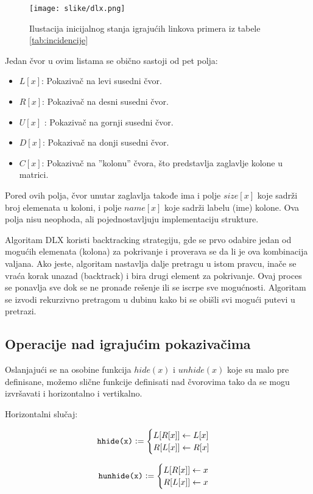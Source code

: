 \documentclass[a4paper]{article}
\begin{document}
{\begin{figure}[h!]
  \begin{center}
  \texttt{[image: slike/dlx.png]}
  \end{center}
  \caption{Ilustacija inicijalnog stanja igrajućih linkova primera iz tabele \ref{tab:incidencije}}
  \label{fig:dlx}
\end{figure}

Jedan čvor u ovim listama se obično sastoji od pet polja:
\begin{itemize}
  \item \( L[x] \): Pokazivač na levi susedni čvor.
  \item \( R[x] \): Pokazivač na desni susedni čvor.
  \item \( U[x] \) : Pokazivač na gornji susedni čvor.
  \item \( D[x] \): Pokazivač na donji susedni čvor.
  \item \( C[x] \): Pokazivač na ''kolonu'' čvora, što predstavlja zaglavlje kolone u matrici.
\end{itemize}

Pored ovih polja, čvor unutar zaglavlja takođe ima i polje \( size[x] \) koje sadrži broj elemenata u
koloni, i polje \( name[x] \) koje sadrži labelu (ime) kolone. Ova polja nisu neophoda, ali pojednostavljuju
implementaciju strukture.

Algoritam DLX koristi backtracking strategiju, gde se prvo odabire jedan od mogućih elemenata (kolona) za
pokrivanje i proverava se da li je ova kombinacija valjana. Ako jeste, algoritam nastavlja dalje pretragu
u istom pravcu, inače se vraća korak unazad (backtrack) i bira drugi element za pokrivanje. Ovaj proces se
ponavlja sve dok se ne pronađe rešenje ili se iscrpe sve mogućnosti. Algoritam se izvodi rekurzivno
pretragom u dubinu kako bi se obišli svi mogući putevi u pretrazi.

\subsection{Operacije nad igrajućim pokazivačima}

Oslanjajući se na osobine funkcija  \( hide(x) \) i \( unhide(x) \) koje su malo pre definisane,
možemo slične funkcije definisati nad čvorovima tako da se mogu izvršavati i horizontalno i vertikalno.

Horizontalni slučaj:\\
\begin{minipage}{0.45\textwidth}
  \[
  \texttt{hhide(x)} \vcentcolon =
  \begin{cases}
    L[R[x]] \gets L[x] \\
    R[L[x]] \gets R[x]
  \end{cases}
  \]
\end{minipage}
\begin{minipage}{0.45\textwidth}
  \[
  \texttt{hunhide(x)} \vcentcolon =
  \begin{cases}
    L[R[x]] \gets x \\
    R[L[x]] \gets x
  \end{cases}
  \]
\end{minipage}\\

}
\end{document}
